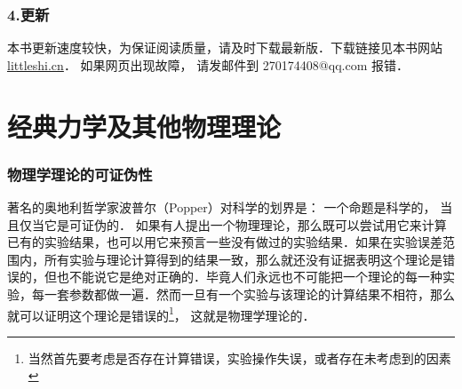 \subsection{4.更新}
本书更新速度较快，为保证阅读质量，请及时下载最新版．下载链接见本书网站 \href{http://littleshi.cn}{\color{blue}littleshi.cn}． 如果网页出现故障， 请发邮件到 270174408@qq.com 报错．





\chapter*{经典力学及其他物理理论}



\subsection{物理学理论的可证伪性}

著名的奥地利哲学家波普尔（Popper）对科学的划界是： 一个命题是科学的， 当且仅当它是可证伪的． 如果有人提出一个物理理论，那么既可以尝试用它来计算已有的实验结果，也可以用它来预言一些没有做过的实验结果．如果在实验误差范围内，所有实验与理论计算得到的结果一致，那么就还没有证据表明这个理论是错误的，但也不能说它是绝对正确的．毕竟人们永远也不可能把一个理论的每一种实验，每一套参数都做一遍．然而一旦有一个实验与该理论的计算结果不相符，那么就可以证明这个理论是错误的\footnote{当然首先要考虑是否存在计算错误，实验操作失误，或者存在未考虑到的因素}， 这就是物理学理论的．

